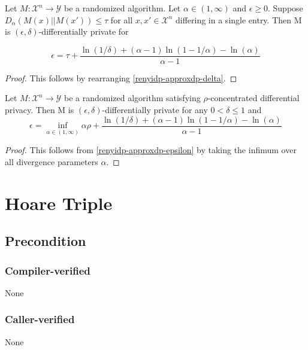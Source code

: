 \documentclass{article}
\begin{document}
\begin{corollary}
\label{renyidp-approxdp-epsilon}
\cite{CKS20} Let $M: \mathcal{X}^n \rightarrow \mathcal{Y}$ be a randomized algorithm. Let $\alpha \in (1, \infty)$ and $\epsilon \geq 0$. Suppose $D_\alpha(M(x) || M(x')) \leq \tau$ for all $x, x' \in \mathcal{X}^n$ differing in a single entry. Then M is $(\epsilon, \delta)$-differentially private for

\begin{equation}
    \epsilon = \tau + \frac{\ln(1 / \delta) + (\alpha - 1) \ln(1 - 1/\alpha) - \ln(\alpha)}{\alpha - 1}
\end{equation}
\end{corollary}

\begin{proof}
This follows by rearranging \ref{renyidp-approxdp-delta}.
\end{proof}

\begin{corollary}
\label{zcdp-approxdp-epsilon}
Let $M: \mathcal{X}^n \rightarrow \mathcal{Y}$ be a randomized algorithm satisfying $\rho$-concentrated differential privacy. Then M is $(\epsilon, \delta)$-differentially private for any $0 < \delta \leq 1$ and
\begin{equation}
    \epsilon = \inf\limits_{\alpha \in (1, \infty)} \alpha \rho + \frac{\ln(1 / \delta) + (\alpha - 1) \ln(1 - 1/\alpha) - \ln(\alpha)}{\alpha - 1}
\end{equation}
\end{corollary}

\begin{proof}
This follows from \ref{renyidp-approxdp-epsilon} by taking the infimum over all divergence parameters $\alpha$.
\end{proof}

\section{Hoare Triple}
\subsection*{Precondition}
\subsubsection*{Compiler-verified}
None

\subsubsection*{Caller-verified}
None
\end{document}
